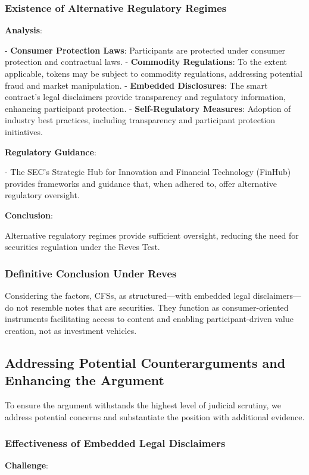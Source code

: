 \documentclass[a4paper,12pt]{article}
\begin{document}
\subsubsection{Existence of Alternative Regulatory Regimes}
\textbf{Analysis}:

- \textbf{Consumer Protection Laws}: Participants are protected under consumer protection and contractual laws.
- \textbf{Commodity Regulations}: To the extent applicable, tokens may be subject to commodity regulations, addressing potential fraud and market manipulation.
- \textbf{Embedded Disclosures}: The smart contract's legal disclaimers provide transparency and regulatory information, enhancing participant protection.
- \textbf{Self-Regulatory Measures}: Adoption of industry best practices, including transparency and participant protection initiatives.

\textbf{Regulatory Guidance}:

- The SEC's Strategic Hub for Innovation and Financial Technology (FinHub) provides frameworks and guidance that, when adhered to, offer alternative regulatory oversight.

\textbf{Conclusion}:

Alternative regulatory regimes provide sufficient oversight, reducing the need for securities regulation under the Reves Test.

\subsubsection{Definitive Conclusion Under Reves}
Considering the factors, CFSs, as structured—with embedded legal disclaimers—do not resemble notes that are securities. They function as consumer-oriented instruments facilitating access to content and enabling participant-driven value creation, not as investment vehicles.

\subsection{Addressing Potential Counterarguments and Enhancing the Argument}
To ensure the argument withstands the highest level of judicial scrutiny, we address potential concerns and substantiate the position with additional evidence.

\subsubsection{Effectiveness of Embedded Legal Disclaimers}
\textbf{Challenge}:
\end{document}

